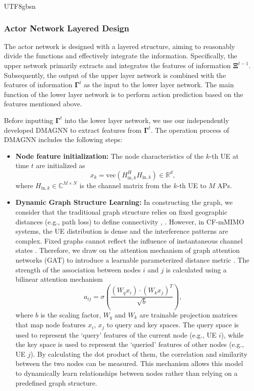 \documentclass[lettersize,journal]{IEEEtran}
\begin{document}
\begin{CJK}{UTF8}{gbsn}
\subsubsection{Actor Network Layered Design}
The actor network is designed with a layered structure, aiming to reasonably divide the functions and effectively integrate the information. Specifically, the upper network primarily extracts and integrates the features of information $\mathbf{\Xi }^{t-1} $. Subsequently, the output of the upper layer network is combined with the features of information $\mathbf{\Gamma} ^t$ as the input to the lower layer network. The main function of the lower layer network is to perform action prediction based on the features mentioned above. 

Before inputting $\mathbf{\Gamma} ^t$ into the lower layer network, we use our independently developed DMAGNN to extract features from $\mathbf{\Gamma} ^t $. The operation process of DMAGNN includes the following steps:
\begin{itemize}
\item {\bf{Node feature initialization:}}
The node characteristics of the $k$-th UE at time $t$ are initialized as
\begin{equation}\label{eq-38}x_k=\text{vec}(H_{\text{in},k}^HH_{\text{in},k})\in \mathbb{R}^d, \end{equation}
where $H_{\text{in},k}\in \mathbb{C} ^{M\times N}$ is the channel matrix from the $k$-th UE to $M$ APs.

\item{\bf{Dynamic Graph Structure Learning:}}
In constructing the graph, we consider that the traditional graph structure relies on fixed geographic distances (e.g., path loss) to define connectivity \cite{paper11}, \cite{paper12}. However, in CF-mMIMO systems, the UE distribution is dense and the interference patterns are complex. Fixed graphs cannot reflect the influence of instantaneous channel states \cite{paper10}. Therefore, we draw on the attention mechanism of graph attention networks (GAT) to introduce a learnable parameterized distance metric \cite{paper13}. The strength of the association between nodes $i$ and $j$ is calculated using a bilinear attention mechanism
\begin{equation}\label{eq-39}a_{ij}=\sigma \left ( \frac{\left ( W_qx_i \right ) \cdot \left ( W_kx_j \right )  ^T}{\sqrt{b} } \right  ), \end{equation}
where $b $ is the scaling factor, $W_q$ and $W_k$ are trainable projection matrices that map node features $x_i$, $x_j$ to query and key spaces. The query space is used to represent the ‘query’ features of the current node (e.g., UE $i$), while the key space is used to represent the ‘queried’ features of other nodes (e.g., UE $j$). By calculating the dot product of them, the correlation and similarity between the two nodes can be measured. This mechanism allows this model to dynamically learn relationships between nodes rather than relying on a predefined graph structure.


\end{itemize}
\end{CJK}
\end{document}
